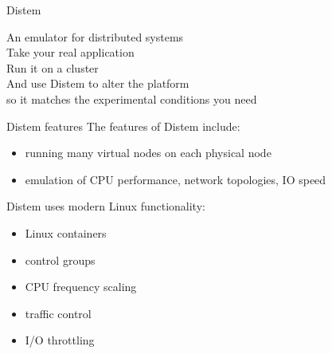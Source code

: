\documentclass[11pt,xcolor=dvipsnames,presentation]{beamer}
\begin{document}
\begin{frame}[label=sec-1-0-1]{Distem}
\begin{center}
\huge
An emulator for distributed systems\\[0.5em]
\large
Take your \alert{real application}\\[0.5em]
Run it on a \alert{cluster}\\[0.5em]
And use \alert{Distem} to \alert{alter the platform}\\
so it \alert{matches the experimental conditions you need}\\[1em]
\normalsize
{}
\end{center}
\end{frame}



\begin{frame}[label=sec-1-0-2]{Distem features}
The features of Distem include:

\begin{itemize}
\item running many virtual nodes on each physical node
\item emulation of CPU performance, network topologies, IO speed
\end{itemize}

Distem uses modern Linux functionality:

\begin{itemize}
\item Linux containers
\item control groups
\item CPU frequency scaling
\item traffic control
\item I/O throttling
\end{itemize}
\end{frame}
\end{document}
